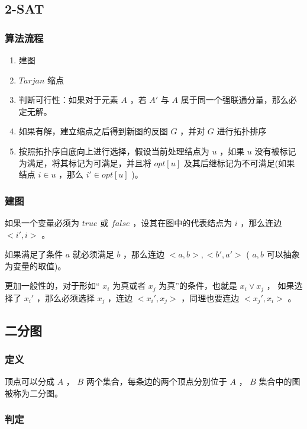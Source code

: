 \documentclass[11pt]{article}
\begin{document}
\subsection{2-SAT}
\label{sec-6-2}
\subsubsection{算法流程}
\label{sec-6-2-1}

\begin{enumerate}
\item 建图
\item $Tarjan$ 缩点
\item 判断可行性：如果对于元素 $A$ ，若 $A'$ 与 $A$ 属于同一个强联通分量，那么必定无解。
\item 如果有解，建立缩点之后得到新图的反图 $G$ ，并对 $G$ 进行拓扑排序
\item 按照拓扑序自底向上进行选择，假设当前处理结点为 $u$ ，如果 $u$ 没有被标记为满足，将其标记为可满足，并且将 $opt[u]$ 及其后继标记为不可满足(如果结点 $i \in u$ ，那么 $i' \in opt[u]$ )。
\end{enumerate}

\subsubsection{建图}
\label{sec-6-2-2}

如果一个变量必须为 $true$ 或 $false$ ，设其在图中的代表结点为 $i$ ，那么连边 $<i',i>$ 。

如果满足了条件 $a$ 就必须满足 $b$ ，那么连边 $<a,b>,<b',a'>$ ( $a,b$ 可以抽象为变量的取值)。

更加一般性的，对于形如“ $x_i$ 为真或者 $x_j$ 为真”的条件，也就是 $x_i \vee x_j$ ， 如果选择了 $x_i'$ ，那么必须选择 $x_j$ ，连边 $<x_i',x_j>$ ，同理也要连边 $<x_j',x_i>$ 。
\subsection{二分图}
\label{sec-6-3}
\subsubsection{定义}
\label{sec-6-3-1}

顶点可以分成 $A$ ， $B$ 两个集合，每条边的两个顶点分别位于 $A$ ， $B$ 集合中的图被称为二分图。

\subsubsection{判定}
\label{sec-6-3-2}
\end{document}
